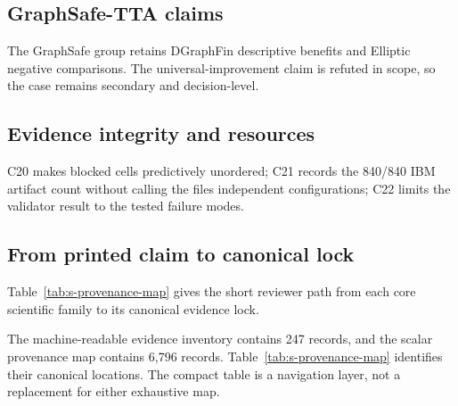 \subsection{GraphSafe-TTA claims}



The GraphSafe group retains DGraphFin descriptive benefits and Elliptic negative comparisons. The universal-improvement claim is refuted in scope, so the case remains secondary and decision-level.

\subsection{Evidence integrity and resources}



C20 makes blocked cells predictively unordered; C21 records the 840/840 IBM artifact count without calling the files independent configurations; C22 limits the validator result to the tested failure modes.

\subsection{From printed claim to canonical lock}

Table~\ref{tab:s-provenance-map} gives the short reviewer path from each core scientific family to its canonical evidence lock.



The machine-readable evidence inventory contains 247 records, and the scalar provenance map contains 6,796 records. Table~\ref{tab:s-provenance-map} identifies their canonical locations. The compact table is a navigation layer, not a replacement for either exhaustive map.
